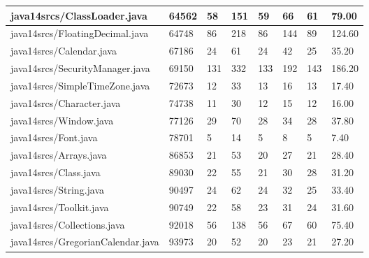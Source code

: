 \begin{tabular}{|l|l|l|l|l|l|l|l|}
\hline
java14srcs/ClassLoader.java                        & 64562       & 58        & 151       & 59        & 66        & 61        & 79.00     \\
\hline
java14srcs/FloatingDecimal.java                    & 64748       & 86        & 218       & 86        & 144       & 89        & 124.60    \\
\hline
java14srcs/Calendar.java                           & 67186       & 24        & 61        & 24        & 42        & 25        & 35.20     \\
\hline
java14srcs/SecurityManager.java                    & 69150       & 131       & 332       & 133       & 192       & 143       & 186.20    \\
\hline
java14srcs/SimpleTimeZone.java                     & 72673       & 12        & 33        & 13        & 16        & 13        & 17.40     \\
\hline
java14srcs/Character.java                          & 74738       & 11        & 30        & 12        & 15        & 12        & 16.00     \\
\hline
java14srcs/Window.java                             & 77126       & 29        & 70        & 28        & 34        & 28        & 37.80     \\
\hline
java14srcs/Font.java                               & 78701       & 5         & 14        & 5         & 8         & 5         & 7.40      \\
\hline
java14srcs/Arrays.java                             & 86853       & 21        & 53        & 20        & 27        & 21        & 28.40     \\
\hline
java14srcs/Class.java                              & 89030       & 22        & 55        & 21        & 30        & 28        & 31.20     \\
\hline
java14srcs/String.java                             & 90497       & 24        & 62        & 24        & 32        & 25        & 33.40     \\
\hline
java14srcs/Toolkit.java                            & 90749       & 22        & 58        & 23        & 31        & 24        & 31.60     \\
\hline
java14srcs/Collections.java                        & 92018       & 56        & 138       & 56        & 67        & 60        & 75.40     \\
\hline
java14srcs/GregorianCalendar.java                  & 93973       & 20        & 52        & 20        & 23        & 21        & 27.20     \\

\end{tabular}
